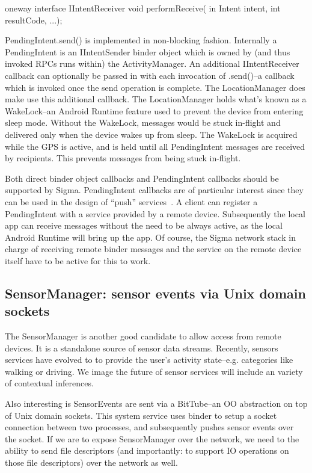 \documentclass[prodmode]{acmlarge}
\begin{document}
\begin{snippet}
oneway interface IIntentReceiver {
  void performReceive(
      in Intent intent, int resultCode,
      ...);
}
\end{snippet}

PendingIntent.send() is implemented in non-blocking fashion. Internally a PendingIntent is an IIntentSender binder object which is owned by (and thus invoked RPCs runs within) the ActivityManager. An additional IIntentReceiver callback can optionally be passed in with each invocation of .send()--a callback which is invoked once the send operation is complete. The LocationManager does make use this additional callback. The LocationManager holds what's known as a WakeLock--an Android Runtime feature used to prevent the device from entering sleep mode. Without the WakeLock, messages would be stuck in-flight and delivered only when the device wakes up from sleep. The WakeLock is acquired while the GPS is active, and is held until all PendingIntent messages are received by recipients. This prevents messages from being stuck in-flight.

Both direct binder object callbacks and PendingIntent callbacks should be supported by Sigma. PendingIntent callbacks are of particular interest since they can be used in the design of ``push'' services~\cite{PushTechnology}. A client can register a PendingIntent with a service provided by a remote device. Subsequently the local app can receive messages without the need to be always active, as the local Android Runtime will bring up the app. Of course, the Sigma network stack in charge of receiving remote binder messages and the service on the remote device itself have to be active for this to work.

\subsection{SensorManager: sensor events via Unix domain sockets}
The SensorManager is another good candidate to allow access from remote devices. It is a standalone source of sensor data streams. Recently, sensors services have evolved to to provide the user's activity state--e.g. categories like walking or driving. We image the future of sensor services will include an variety of contextual inferences.

Also interesting is SensorEvents are sent via a BitTube--an OO abstraction on top of Unix domain sockets. This system service uses binder to setup a socket connection between two processes, and subsequently pushes sensor events over the socket. If we are to expose SensorManager over the network, we need to the ability to send file descriptors (and importantly: to support IO operations on those file descriptors) over the network as well.
\end{document}
